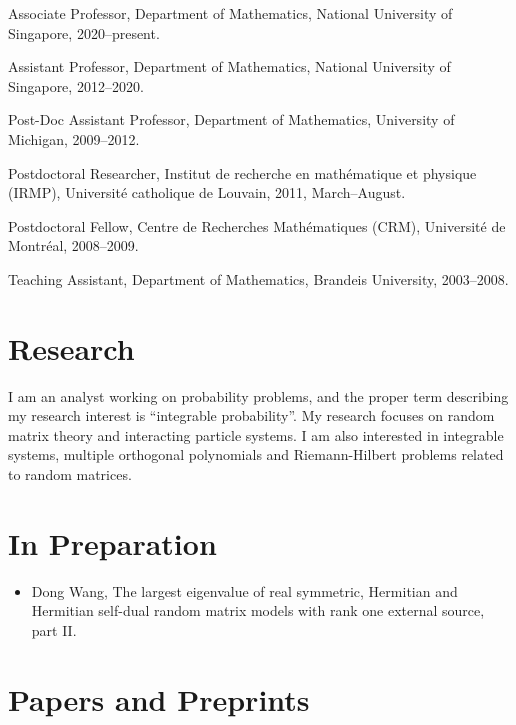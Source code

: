 \documentclass[12pt,a4paper]{article}
\newenvironment{item_list}{
 \begin{list}{}{
   \setlength{\leftmargin}{1.5em}
   \setlength{\itemsep}{0.25em}
   \setlength{\parskip}{0pt}
   \setlength{\parsep}{0.25em}
 }
}{
 \end{list}
}
\begin{document}
\begin{item_list}
\item
  Associate Professor, Department of Mathematics, National University of Singapore, 2020--present.
\item
  Assistant Professor, Department of Mathematics, National University of Singapore, 2012--2020.
\item
  Post-Doc Assistant Professor, Department of Mathematics, University of Michigan,
  2009--2012.
\item
  Postdoctoral Researcher, Institut de recherche en math\'{e}matique et physique (IRMP), Universit\'{e} catholique de Louvain, 2011, March--August.
\item
  Postdoctoral Fellow, Centre de Recherches Math\'{e}matiques (CRM), Universit\'{e} de Montr\'{e}al, 2008--2009.
\item
  Teaching Assistant, Department of Mathematics, Brandeis University, 2003--2008.
\end{item_list}

\section*{Research}

I am an analyst working on probability problems, and the proper term describing my research interest is ``integrable probability''. My research focuses on random matrix theory and interacting particle systems. I am also interested in integrable systems, multiple orthogonal polynomials and Riemann-Hilbert problems related to random matrices.

\section*{In Preparation}

\begin{itemize}
\item
  Dong Wang, The largest eigenvalue of real symmetric, Hermitian and Hermitian self-dual random matrix models with rank one external source, part II.
\end{itemize}

\section*{Papers and Preprints}
\end{document}
